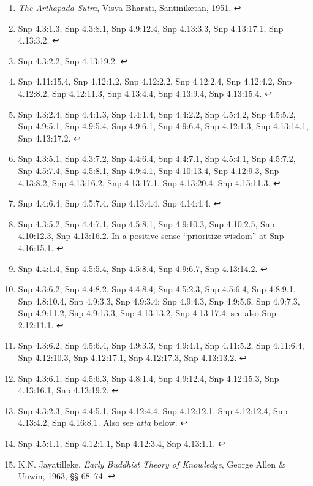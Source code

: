 \documentclass[12pt,openany]{book}%
\begin{document}
\begin{enumerate}
%
\item \textit{The Arthapada Sutra}, Visva-Bharati, Santiniketan, 1951. ↩

%
\item Snp 4.3:1.3, Snp 4.3:8.1, Snp 4.9:12.4, Snp 4.13:3.3, Snp 4.13:17.1, Snp 4.13:3.2. ↩

%
\item Snp 4.3:2.2, Snp 4.13:19.2. ↩

%
\item Snp 4.11:15.4, Snp 4.12:1.2, Snp 4.12:2.2, Snp 4.12:2.4, Snp 4.12:4.2, Snp 4.12:8.2, Snp 4.12:11.3, Snp 4.13:4.4, Snp 4.13:9.4, Snp 4.13:15.4. ↩

%
\item Snp 4.3:2.4, Snp 4.4:1.3, Snp 4.4:1.4, Snp 4.4:2.2, Snp 4.5:4.2, Snp 4.5:5.2, Snp 4.9:5.1, Snp 4.9:5.4, Snp 4.9:6.1, Snp 4.9:6.4, Snp 4.12:1.3, Snp 4.13:14.1, Snp 4.13:17.2. ↩

%
\item Snp 4.3:5.1, Snp 4.3:7.2, Snp 4.4:6.4, Snp 4.4:7.1, Snp 4.5:4.1, Snp 4.5:7.2, Snp 4.5:7.4, Snp 4.5:8.1, Snp 4.9:4.1, Snp 4.10:13.4, Snp 4.12:9.3, Snp 4.13:8.2, Snp 4.13:16.2, Snp 4.13:17.1, Snp 4.13:20.4, Snp 4.15:11.3. ↩

%
\item Snp 4.4:6.4, Snp 4.5:7.4, Snp 4.13:4.4, Snp 4.14:4.4. ↩

%
\item Snp 4.3:5.2, Snp 4.4:7.1, Snp 4.5:8.1, Snp 4.9:10.3, Snp 4.10:2.5, Snp 4.10:12.3, Snp 4.13:16.2. In a positive sense “prioritize wisdom” at Snp 4.16:15.1. ↩

%
\item Snp 4.4:1.4, Snp 4.5:5.4, Snp 4.5:8.4, Snp 4.9:6.7, Snp 4.13:14.2. ↩

%
\item Snp 4.3:6.2, Snp 4.4:8.2, Snp 4.4:8.4; Snp 4.5:2.3, Snp 4.5:6.4, Snp 4.8:9.1, Snp 4.8:10.4, Snp 4.9:3.3, Snp 4.9:3.4; Snp 4.9:4.3, Snp 4.9:5.6, Snp 4.9:7.3, Snp 4.9:11.2, Snp 4.9:13.3, Snp 4.13:13.2, Snp 4.13:17.4; see also Snp 2.12:11.1. ↩

%
\item Snp 4.3:6.2, Snp 4.5:6.4, Snp 4.9:3.3, Snp 4.9:4.1, Snp 4.11:5.2, Snp 4.11:6.4, Snp 4.12:10.3, Snp 4.12:17.1, Snp 4.12:17.3, Snp 4.13:13.2. ↩

%
\item Snp 4.3:6.1, Snp 4.5:6.3, Snp 4.8:1.4, Snp 4.9:12.4, Snp 4.12:15.3, Snp 4.13:16.1, Snp 4.13:19.2. ↩

%
\item Snp 4.3:2.3, Snp 4.4:5.1, Snp 4.12:4.4, Snp 4.12:12.1, Snp 4.12:12.4, Snp 4.13:4.2, Snp 4.16:8.1. Also see \textit{atta} below. ↩

%
\item Snp 4.5:1.1, Snp 4.12:1.1, Snp 4.12:3.4, Snp 4.13:1.1. ↩

%
\item K.N. Jayatilleke, \textit{Early Buddhist Theory of Knowledge}, George Allen \& Unwin, 1963, §§ 68–74. ↩

%
\end{enumerate}
\end{document}
